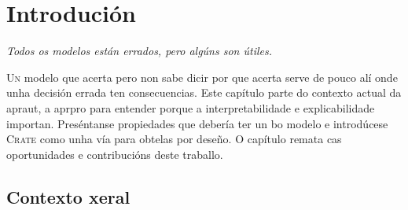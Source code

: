 \chapter{Introdución}
\label{chap:introducion}

\hfill\emph{Todos os modelos están errados, pero algúns son útiles.} \cite{box}

\lettrine{U}{n} modelo que acerta pero non sabe dicir por que acerta serve de pouco alí onde unha decisión errada ten consecuencias. Este capítulo parte do contexto actual da \acrfull{apraut}, a \acrfull{aprpro} para entender porque a \gls{interpretabilidade} e \gls{explicabilidade} importan. Preséntanse propiedades que debería ter un bo modelo e introdúcese \textsc{Crate} como unha vía para obtelas por deseño. O capítulo remata cas oportunidades e contribucións deste traballo.

\section{Contexto xeral}
\label{sec:contextoxeral}



